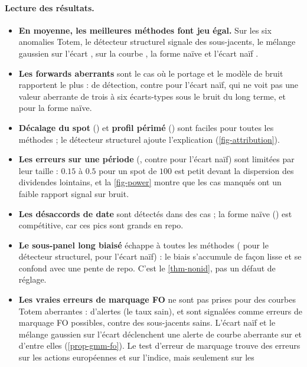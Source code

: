 \paragraph{Lecture des résultats.}
\begin{itemize}
\item \textbf{En moyenne, les meilleures méthodes font jeu égal.} Sur les six anomalies Totem, le détecteur structurel
signale \vMeanStruct{} des sous-jacents, le mélange gaussien sur l'écart \vMeanGmmDiff, sur la courbe \vMeanGmmCurve, la
forme naïve \vMeanShape{} et l'écart naïf \vMeanNaive.
\item \textbf{Les forwards aberrants} sont le cas où le portage et le modèle de bruit rapportent le plus : \vFwdStruct{}
de détection, contre \vFwdNaive{} pour l'écart naïf, qui ne voit pas une valeur aberrante de trois à six écarts-types
sous le bruit du long terme, et \vFwdShape{} pour la forme naïve.
\item \textbf{Décalage du spot} (\vSpotStruct) et \textbf{profil périmé} (\vSeasonStruct) sont faciles pour toutes les
méthodes ; le détecteur structurel ajoute l'explication (\cref{fig-attribution}).
\item \textbf{Les erreurs sur une période} (\vBucketStruct, contre \vBucketNaive{} pour l'écart naïf) sont limitées par
leur taille : $\num{0.15}$ à $\num{0.5}$ pour un spot de $100$ est petit devant la dispersion des dividendes lointains,
et la \cref{fig-power} montre que les cas manqués ont un faible rapport signal sur bruit.
\item \textbf{Les désaccords de date} sont détectés dans \vTimingStruct{} des cas ; la forme naïve (\vTimingShape) est
compétitive, car ces pics sont grands en repo.
\item \textbf{Le sous-panel long biaisé} échappe à toutes les méthodes (\vPanelStruct{} pour le détecteur structurel,
\vPanelNaive{} pour l'écart naïf) : le biais s'accumule de façon lisse et se confond avec une pente de repo. C'est le
\cref{thm-nonid}, pas un défaut de réglage.
\item \textbf{Les vraies erreurs de marquage FO} ne sont pas prises pour des courbes Totem aberrantes : \vFoStruct{}
d'alertes (le taux sain), et \vFoMismark{} sont signalées comme erreurs de marquage FO possibles, contre \vFoClean{}
des sous-jacents sains. L'écart naïf et le mélange gaussien sur l'écart déclenchent une alerte de courbe aberrante sur
\vFoNaive{} et \vFoGmmDiff{} d'entre elles (\cref{prop-gmm-fo}). Le test d'erreur de marquage trouve \vFoMismarkEuStock{}
des erreurs sur les actions européennes et \vFoMismarkIndex{} sur l'indice, mais seulement \vFoMismarkHtb{} sur les

\end{itemize}
